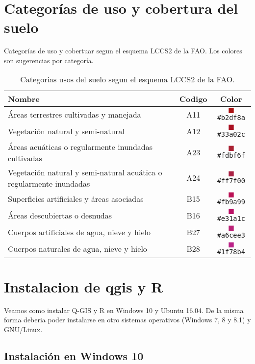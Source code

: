 \chapter{Categor\'ias de uso y cobertura del suelo}\label{apcate}
Categor\'ias de uso y cobertuar segun el esquema LCCS2 de la FAO\@. Los colores son sugerencias por categor\'ia.
\begin{table}[hbt]
    \centering
    \begin{tabular}{p{11cm}cc}
        \toprule
        Nombre & Codigo & Color \\
        \midrule
        Áreas terrestres cultivadas y manejada & A11 & \textcolor{A11}{$\blacksquare$}\texttt{\#b2df8a}
        \\
        Vegetación natural y semi-natural & A12 & \textcolor{A12}{$\blacksquare$}\texttt{\#33a02c}\\
        Áreas acuáticas o regularmente inundadas cultivadas & A23  &
        \textcolor{A23}{$\blacksquare$}\texttt{\#fdbf6f}\\
        Vegetación natural y semi-natural acuática o
	regularmente inundadas & A24 & \textcolor{A24}{$\blacksquare$}\texttt{\#ff7f00}\\
        Superficies artificiales y áreas asociadas & B15  &
        \textcolor{B15}{$\blacksquare$}\texttt{\#fb9a99}\\
        Áreas descubiertas o desnudas & B16 & \textcolor{B16}{$\blacksquare$}\texttt{\#e31a1c}\\
        Cuerpos artificiales de agua, nieve y hielo & B27 &
        \textcolor{B27}{$\blacksquare$}\texttt{\#a6cee3}\\
        Cuerpos naturales de agua, nieve y hielo & B28&
        \textcolor{B28}{$\blacksquare$}\texttt{\#1f78b4}\\
        \bottomrule
    \end{tabular}
\caption{\label{tabla1}Categorias usos del suelo segun el esquema LCCS2 de la
FAO.}
\end{table}

\chapter{Instalacion de qgis y R} \label{chap:instalacion}

Veamos como instalar Q-GIS y R en Windows 10 y Ubuntu 16.04. De la misma forma deberia poder instalarse en otro sistemas operativos (Windows 7, 8 y 8.1) y GNU/Linux.

\section{Instalaci\'on en Windows 10}

